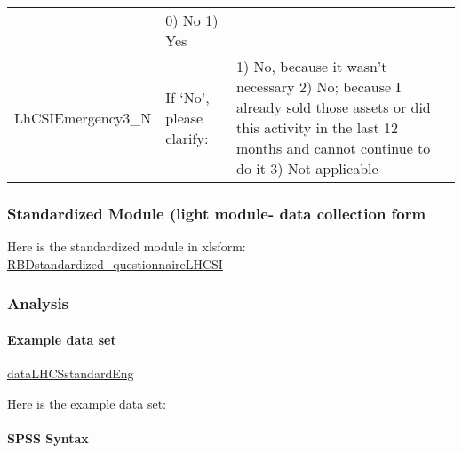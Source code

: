 \documentclass[
]{article}
\begin{document}
\begin{longtable}[]{@{}lll@{}}
\begin{minipage}[t]{0.49\columnwidth}
\end{minipage} & \begin{minipage}[t]{0.27\columnwidth}\raggedright
0) No 1) Yes\strut
\end{minipage}\tabularnewline
\begin{minipage}[t]{0.15\columnwidth}\raggedright
LhCSIEmergency3\_N\strut
\end{minipage} & \begin{minipage}[t]{0.49\columnwidth}\raggedright
If `No', please clarify:\strut
\end{minipage} & \begin{minipage}[t]{0.27\columnwidth}\raggedright
1) No, because it wasn't necessary 2) No; because I already sold those assets or did this activity in the last 12 months and cannot continue to do it 3) Not applicable\strut
\end{minipage}\tabularnewline
\bottomrule
\end{longtable}

\hypertarget{standardized-module-light-module--data-collection-form-1}{%
\subsubsection{Standardized Module (light module- data collection form}\label{standardized-module-light-module--data-collection-form-1}}

Here is the standardized module in xlsform: \href{https://www.dropbox.com/s/wfiuy5kn8yhd0ct/RBDstandardized_questionnaireLHCSI.xlsx?dl=0}{RBDstandardized\_questionnaireLHCSI}

\hypertarget{analysis-3}{%
\subsubsection{Analysis}\label{analysis-3}}

\hypertarget{example-data-set-3}{%
\paragraph{Example data set}\label{example-data-set-3}}

\href{https://www.dropbox.com/s/3ua1zja0ln4ojsl/dataLHCSstandardEng.sav?dl=0}{dataLHCSstandardEng}

Here is the example data set:

\hypertarget{spss-syntax-3}{%
\paragraph{SPSS Syntax}\label{spss-syntax-3}}
\end{document}
